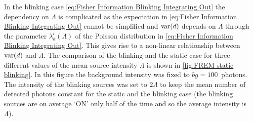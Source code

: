 

In the blinking case \autoref{eq:Fisher Information Blinking Integrating Out} the dependency on $\Lambda$ is complicated as the expectation in \autoref{eq:Fisher Information Blinking Integrating Out} cannot be simplified and $\mathrm{var}(d)$ depends on $\Lambda$ through the parameter $\lambda_k^i(\Lambda)$ of the Poisson distribution in \autoref{eq:Fisher Information Blinking Integrating Out}. This gives rise to a non-linear relationship between $\mathrm{var}(d)$ and $\Lambda$.
%
The comparison of the blinking and the static case for three different values of the mean source intensity $\Lambda$ is shown in \autoref{fig:FREM static blinking}\aaa. In this figure the background intensity was fixed to $bg=100$~photons. The intensity of the blinking sources was set to $2\Lambda$ to keep the mean number of detected photons constant for the static and the blinking case (the blinking sources are on average `ON' only half of the time and so the average intensity is $\Lambda$). 

